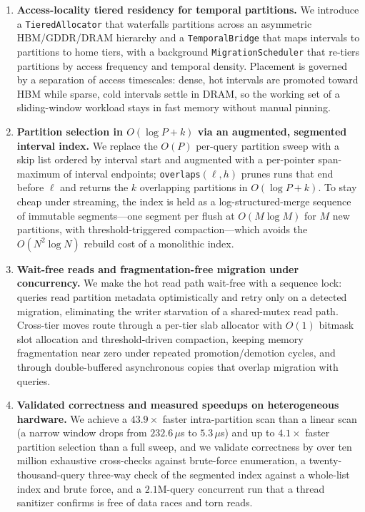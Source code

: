 \documentclass[10pt]{article}
\theoremstyle{definition}
\begin{document}
\begin{enumerate}
  \item \textbf{Access-locality tiered residency for temporal partitions.}
  We introduce a \texttt{TieredAllocator} that waterfalls partitions across an
  asymmetric HBM/GDDR/DRAM hierarchy and a \texttt{TemporalBridge} that maps
  intervals to partitions to home tiers, with a background
  \texttt{MigrationScheduler} that re-tiers partitions by access frequency and
  temporal density. Placement is governed by a separation of access timescales:
  dense, hot intervals are promoted toward HBM while sparse, cold intervals
  settle in DRAM, so the working set of a sliding-window workload stays in fast
  memory without manual pinning.

  \item \textbf{Partition selection in $O(\log P + k)$ via an augmented,
  segmented interval index.} We replace the $O(P)$ per-query partition sweep with
  a skip list ordered by interval start and augmented with a per-pointer
  span-maximum of interval endpoints; \texttt{overlaps}$(\ell,h)$ prunes runs that
  end before $\ell$ and returns the $k$ overlapping partitions in
  $O(\log P + k)$. To stay cheap under streaming, the index is held as a
  log-structured-merge sequence of immutable segments---one segment per flush at
  $O(M\log M)$ for $M$ new partitions, with threshold-triggered compaction---which
  avoids the $O(N^2\log N)$ rebuild cost of a monolithic index.

  \item \textbf{Wait-free reads and fragmentation-free migration under concurrency.}
  We make the hot read path wait-free with a sequence lock: queries read partition
  metadata optimistically and retry only on a detected migration, eliminating the
  writer starvation of a shared-mutex read path. Cross-tier moves route through a
  per-tier slab allocator with $O(1)$ bitmask slot allocation and threshold-driven
  compaction, keeping memory fragmentation near zero under repeated
  promotion/demotion cycles, and through double-buffered asynchronous copies that
  overlap migration with queries.

  \item \textbf{Validated correctness and measured speedups on heterogeneous hardware.}
  We achieve a $43.9\times$ faster intra-partition scan than a linear scan
  (a narrow window drops from $232.6\,\mu$s to $5.3\,\mu$s) and up to $4.1\times$
  faster partition selection than a full sweep, and we validate correctness by
  over ten million exhaustive cross-checks against brute-force enumeration,
  a twenty-thousand-query three-way check of the segmented index against a
  whole-list index and brute force, and a $2.1$M-query concurrent run that a
  thread sanitizer confirms is free of data races and torn reads.
\end{enumerate}
\end{document}
